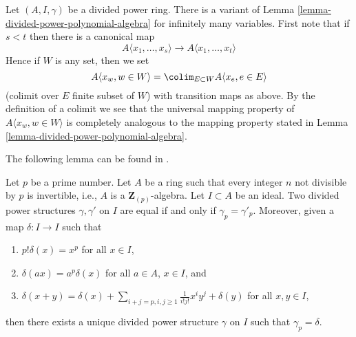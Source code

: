 \begin{remark}
\label{remark-divided-power-polynomial-algebra}
Let $(A, I, \gamma)$ be a divided power ring.
There is a variant of Lemma \ref{lemma-divided-power-polynomial-algebra}
for infinitely many variables. First note that if $s < t$ then there
is a canonical map
$$
A\langle x_1, \ldots, x_s \rangle \to A\langle x_1, \ldots, x_t\rangle
$$
Hence if $W$ is any set, then we set
$$
A\langle x_w, w \in W\rangle =
\colim_{E \subset W} A\langle x_e, e \in E\rangle
$$
(colimit over $E$ finite subset of $W$)
with transition maps as above. By the definition of a colimit we see
that the universal mapping property of $A\langle x_w, w \in W\rangle$ is
completely analogous to the mapping property stated in
Lemma \ref{lemma-divided-power-polynomial-algebra}.
\end{remark}

\noindent
The following lemma can be found in \cite{BO}.

\begin{lemma}
\label{lemma-need-only-gamma-p}
Let $p$ be a prime number. Let $A$ be a ring such that every integer $n$
not divisible by $p$ is invertible, i.e., $A$ is a $\mathbf{Z}_{(p)}$-algebra.
Let $I \subset A$ be an ideal. Two divided power structures
$\gamma, \gamma'$ on $I$ are equal if and only if $\gamma_p = \gamma'_p$.
Moreover, given a map $\delta : I \to I$ such that
\begin{enumerate}
\item $p!\delta(x) = x^p$ for all $x \in I$,
\item $\delta(ax) = a^p\delta(x)$ for all $a \in A$, $x \in I$, and
\item
$\delta(x + y) =
\delta(x) +
\sum\nolimits_{i + j = p, i,j \geq 1} \frac{1}{i!j!} x^i y^j +
\delta(y)$ for all $x, y \in I$,
\end{enumerate}
then there exists a unique divided power structure $\gamma$ on $I$ such
that $\gamma_p = \delta$.
\end{lemma}

